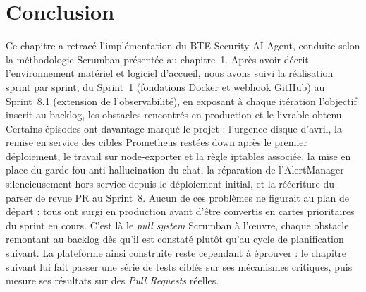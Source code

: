 \section*{Conclusion}

Ce chapitre a retracé l'implémentation du BTE Security AI Agent, conduite selon
la méthodologie Scrumban présentée au chapitre~1. Après avoir décrit l'environnement
matériel et logiciel d'accueil, nous avons suivi la réalisation sprint par sprint, du
Sprint~1 (fondations Docker et webhook GitHub) au Sprint~8.1 (extension de
l'observabilité), en exposant à chaque itération l'objectif inscrit au backlog, les
obstacles rencontrés en production et le livrable obtenu. Certains épisodes ont davantage
marqué le projet : l'urgence disque d'avril, la remise en service des cibles Prometheus
restées \og down \fg{} après le premier déploiement, le travail sur node-exporter et la
règle iptables associée, la mise en place du garde-fou anti-hallucination du chat, la
réparation de l'AlertManager silencieusement hors service depuis le déploiement initial,
et la réécriture du parser de revue PR au Sprint~8. Aucun de ces problèmes ne figurait au
plan de départ : tous ont surgi en production avant d'être convertis en cartes prioritaires
du sprint en cours. C'est là le \textit{pull system} Scrumban à l'œuvre, chaque obstacle
remontant au backlog dès qu'il est constaté plutôt qu'au cycle de planification suivant.
La plateforme ainsi construite reste cependant à éprouver : le chapitre suivant lui fait
passer une série de tests ciblés sur ses mécanismes critiques, puis mesure ses résultats
sur des \textit{Pull Requests} réelles.
